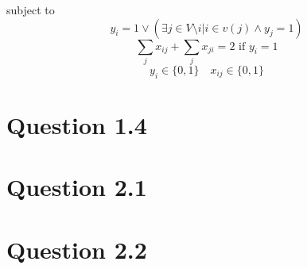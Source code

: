 \documentclass[10pt]{article}
\begin{document}
subject to
\begin{equation}
  y_{i} = 1 \lor (\exists j \in V \setminus i | i \in v(j) \land y_{j} = 1 )
\end{equation}
\begin{equation}
  \sum_{j} x_{ij} + \sum_{j}x_{ji} = 2 \text{ if } y_{i} =1
\end{equation}
\begin{equation}
  y_{i} \in \{0,1\} \quad x_{ij} \in \{0,1\}
\end{equation}


\section*{Question 1.4} %
\label{sec:question_1_4}


\section*{Question 2.1} %
\label{sec:question_2_1}


\section*{Question 2.2} %
\label{sec:question_2_2}




%
%
\end{document}
